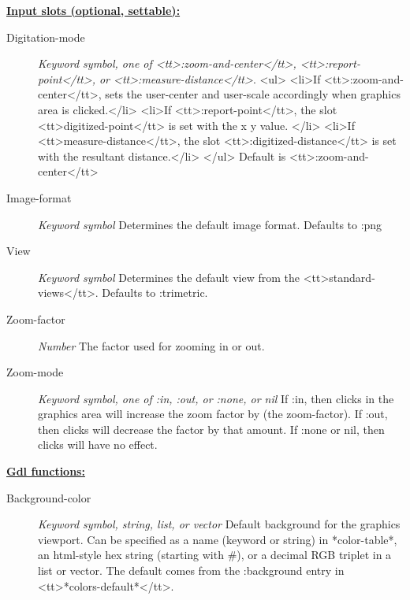\documentclass [11pt]{book}
\begin{document}
\begin{itemize}
\textbf{
\underline{Input slots (optional, settable):}}

\begin{description}

\item [Digitation-mode]
\emph{Keyword symbol, one of <tt>:zoom-and-center</tt>, <tt>:report-point</tt>, or <tt>:measure-distance</tt>}.
<ul>
<li>If <tt>:zoom-and-center</tt>, sets the user-center and user-scale accordingly when graphics
area is clicked.</li>
<li>If <tt>:report-point</tt>, the slot <tt>digitized-point</tt> is set with the x y value. </li>
<li>If <tt>measure-distance</tt>, the slot <tt>:digitized-distance</tt> is set with the resultant distance.</li>
</ul>
Default is <tt>:zoom-and-center</tt>


\item [Image-format]
\emph{Keyword symbol} Determines the default image format. Defaults to :png


\item [View]
\emph{Keyword symbol} Determines the default view from the <tt>standard-views</tt>. Defaults to :trimetric.


\item [Zoom-factor]
\emph{Number} The factor used for zooming in or out.


\item [Zoom-mode]
\emph{Keyword symbol, one of :in, :out, or :none, or nil} If :in, then clicks
in the graphics area will increase the zoom factor by (the zoom-factor). If :out,
then clicks will decrease the factor by that amount. If :none or nil, then clicks
will have no effect.


\end{description}






\textbf{
\underline{Gdl functions:}}

\begin{description}

\item [Background-color]
\emph{Keyword symbol, string, list, or vector} Default background for the graphics viewport. Can be specified
as a name (keyword or string) in *color-table*, an html-style hex string (starting with \#), or a decimal RGB
triplet in a list or vector. The default comes from the :background entry in <tt>*colors-default*</tt>.



\end{description}
\end{itemize}
\end{document}

